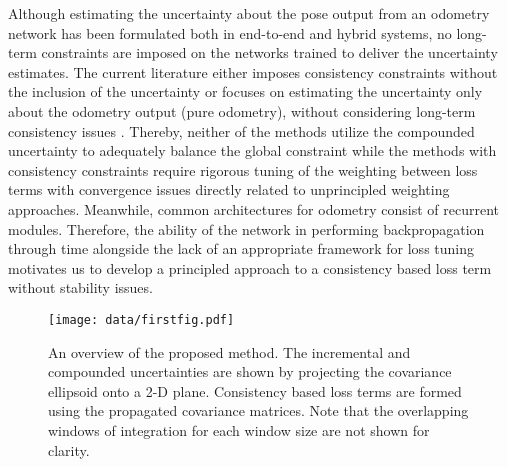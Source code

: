 \documentclass[letterpaper, 10 pt]{ieeeconf}  %
\begin{document}
Although estimating the uncertainty about the pose output from an odometry network has been formulated both in end-to-end and hybrid systems, no long-term constraints are imposed on the networks trained to deliver the uncertainty estimates. The current literature either imposes consistency constraints without the inclusion of the uncertainty \cite{saputra2019learning} or focuses on estimating the uncertainty only about the odometry output (pure odometry), without considering long-term consistency issues \cite{costante2020uncertainty}. Thereby, neither of the methods utilize the compounded uncertainty to adequately balance the global constraint while the methods with consistency constraints require rigorous tuning of the weighting between loss terms with convergence issues directly related to unprincipled weighting approaches. Meanwhile, common architectures for odometry consist of recurrent modules. Therefore, the ability of the network in performing backpropagation through time alongside the lack of an appropriate framework for loss tuning motivates us to develop a principled approach to a consistency based loss term without stability issues.

\begin{figure}[t]
  \texttt{[image: data/firstfig.pdf]}
  \caption{An overview of the proposed method. The incremental and compounded uncertainties are shown by projecting the covariance ellipsoid onto a 2-D plane. Consistency based loss terms are formed using the propagated covariance matrices. Note that the overlapping windows of integration for each window size are not shown for clarity.}
  \label{fig:figure1}
\end{figure}
\end{document}
